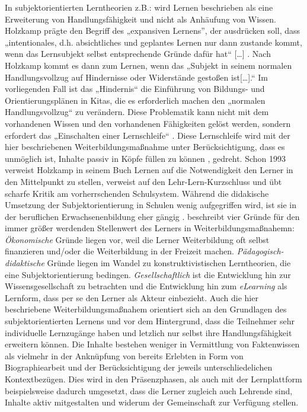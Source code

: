 \documentclass[12pt, bibliography=totoc]{scrartcl}
\begin{document}
In subjektorientierten Lerntheorien z.B.: \parencite{Holzkamp2004} wird
Lernen beschrieben als eine Erweiterung von Handlungsfähigkeit und nicht
als Anhäufung von Wissen. Holzkamp prägte den Begriff des „expansiven
Lernens'', der ausdrücken soll, dass „intentionales, d.h. absichtliches
und geplantes Lernen nur dann zustande kommt, wenn das Lernsubjekt
selbst entsprechende Gründe dafür hat`` {[}\ldots{]}
\parencite[29]{Holzkamp2004}. Nach Holzkamp kommt es dann zum Lernen,
wenn das „Subjekt in seinem normalen Handlungsvollzug auf Hindernisse
oder Widerstände gestoßen ist{[}\ldots{]}.`` Im vorliegenden Fall ist
das „Hindernis`` die Einführung von Bildungs- und Orientierungsplänen in
Kitas, die es erforderlich machen den „normalen Handlungsvollzug`` zu
verändern. Diese Problematik kann nicht mit dem vorhandenen Wissen und
den vorhandenen Fähigkeiten gelöst werden, sondern erfordert das
„Einschalten einer Lernschleife`` \parencite[29]{Holzkamp2004}. Diese
Lernschleife wird mit der hier beschriebenen Weiterbildungsmaßnahme
unter Berücksichtigung, dass es unmöglich ist, Inhalte passiv in Köpfe
füllen zu können \parencite[12]{Faulstich2012}, gedreht. Schon 1993
verweist Holzkamp in seinem Buch Lernen auf die Notwendigkeit den Lerner
in den Mittelpunkt zu stellen, verweist auf den Lehr-Lern-Kurzschluss
und übt scharfe Kritik am vorherrschenden Schulsystem. Während die
didakische Umsetzung der Subjektorientierung in Schulen wenig
aufgegriffen wird, ist sie in der beruflichen Erwachsenenbildung eher
gängig \parencite{grotluschen2005expansives}.
\textcite[138]{ehlers2011qualitat} beschreibt vier Gründe für den immer
größer werdenden Stellenwert des Lerners in Weiterbildungsmaßnahemn:
\emph{Ökonomische} Gründe liegen vor, weil die Lerner Weiterbildung oft
selbst finanzieren und/oder die Weiterbildung in der Freizeit machen.
\emph{Pädagogisch-didaktische} Gründe liegen im Wandel zu
konstruktivistischen Lerntheorien, die eine Subjektorientierung
bedingen. \emph{Gesellschaftlich} ist die Entwicklung hin zur
Wissensgesellschaft zu betrachten und die Entwicklung hin zum
\emph{eLearning} als Lernform, dass per se den Lerner als Akteur
einbezieht. Auch die hier beschriebene Weiterbildungsmaßnahem orientiert
sich an den Grundlagen des subjektorientierten Lernens und vor dem
Hintergrund, dass die Teilnehmer sehr individuelle Lernzugänge haben und
letzlich nur selbst ihre Handlungsfähigkeit erweitern können. Die
Inhalte bestehen weniger in Vermittlung von Faktenwissen als vielmehr in
der Anknüpfung von bereits Erlebten in Form von Biographiearbeit und der
Berücksichtigung der jeweils unterschliedelichen Kontextbezügen. Dies
wird in den Präsenzphasen, als auch mit der Lernplattform beispielsweise
dadurch umgesetzt, dass die Lerner zugleich auch Lehrende sind, Inhalte
aktiv mitgestalten und widerum der Gemeinschaft zur Verfügung stellen.
\end{document}
